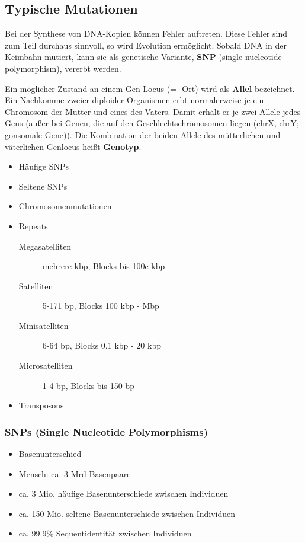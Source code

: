 \subsection{Typische Mutationen}
Bei der Synthese von DNA-Kopien können Fehler auftreten. Diese Fehler sind zum Teil durchaus sinnvoll, so wird Evolution ermöglicht. Sobald DNA in der Keimbahn mutiert, kann sie als genetische Variante, \textbf{SNP} (single nucleotide polymorphism), vererbt werden.

Ein möglicher Zustand an einem Gen-Locus (= -Ort) wird als \textbf{Allel} bezeichnet. Ein Nachkomme zweier diploider Organismen erbt normalerweise je ein Chromosom der Mutter und eines des Vaters. Damit erhält er je zwei Allele jedes Gens (außer bei Genen, die auf den Geschlechtschromosomen liegen (chrX, chrY; gonsomale Gene)). Die Kombination der beiden Allele des mütterlichen und väterlichen Genlocus heißt \textbf{Genotyp}.

\begin{itemize}
    \item Häufige SNPs
    \item Seltene SNPs
    \item Chromosomenmutationen
    \item Repeats
    \begin{description}
        \item[Megasatelliten] mehrere kbp, Blocks bis 100e kbp
        \item[Satelliten] 5-171 bp, Blocks 100 kbp - Mbp
        \item[Minisatelliten] 6-64 bp, Blocks 0.1 kbp - 20 kbp
        \item[Microsatelliten] 1-4 bp, Blocks bis 150 bp
    \end{description}
    \item Transposons
\end{itemize}

\subsubsection{SNPs (Single Nucleotide Polymorphisms)}
\begin{itemize}
    \item Basenunterschied
    \item Mensch: ca. 3 Mrd Basenpaare
    \item ca. 3 Mio. häufige Basenunterschiede zwischen Individuen
    \item ca. 150 Mio. seltene Basenunterschiede zwischen Individuen
    \item ca. 99.9\% Sequentidentität zwischen Individuen
\end{itemize}

